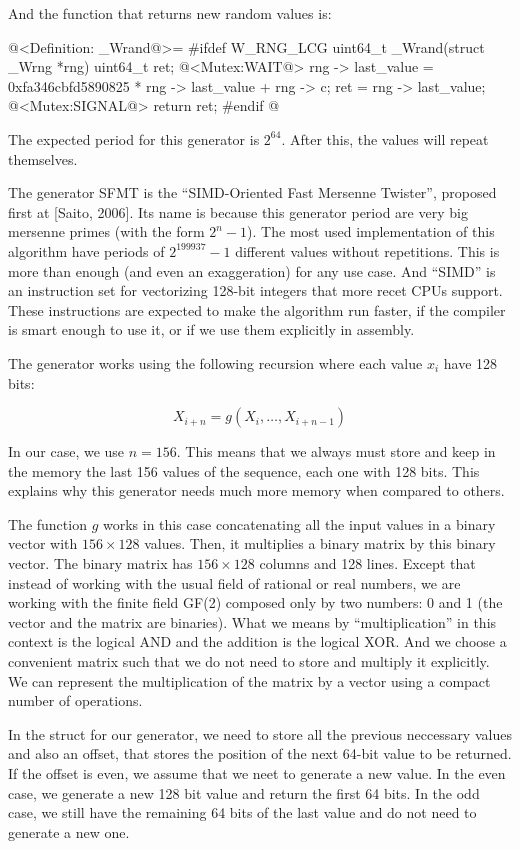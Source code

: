 And the function that returns new random values is:

\iniciocodigo
@<Definition: \_Wrand@>=
#ifdef W_RNG_LCG
uint64_t _Wrand(struct _Wrng *rng){
  uint64_t ret;
  @<Mutex:WAIT@>
  rng -> last_value = 0xfa346cbfd5890825 * rng -> last_value + rng -> c;
  ret = rng -> last_value;
  @<Mutex:SIGNAL@>
  return ret;
}
#endif
@
\fimcodigo

The expected period for this generator is $2^{64}$. After this, the
values will repeat themselves.


The generator SFMT is the ``SIMD-Oriented Fast Mersenne Twister'',
proposed first at [Saito, 2006]. Its name is because this generator
period are very big mersenne primes (with the form $2^n-1$). The most
used implementation of this algorithm have periods of $2^{199937}-1$
different values without repetitions. This is more than enough (and
even an exaggeration) for any use case. And ``SIMD'' is an instruction
set for vectorizing 128-bit integers that more recet CPUs
support. These instructions are expected to make the algorithm run
faster, if the compiler is smart enough to use it, or if we use them
explicitly in assembly.

The generator works using the following recursion where each value
$x_i$ have 128 bits:

$$
X_{i+n}=g(X_i, \ldots, X_{i+n-1})
$$

In our case, we use $n=156$. This means that we always must store and
keep in the memory the last 156 values of the sequence, each one with
128 bits. This explains why this generator needs much more memory when
compared to others.

The function $g$ works in this case concatenating all the input values
in a binary vector with $156 \times 128$ values. Then, it multiplies a
binary matrix by this binary vector. The binary matrix has $156 \times
128$ columns and 128 lines. Except that instead of working with the
usual field of rational or real numbers, we are working with the
finite field GF(2) composed only by two numbers: 0 and 1 (the vector
and the matrix are binaries). What we means by ``multiplication'' in
this context is the logical AND and the addition is the logical
XOR. And we choose a convenient matrix such that we do not need to
store and multiply it explicitly. We can represent the multiplication
of the matrix by a vector using a compact number of operations.

In the struct for our generator, we need to store all the previous
neccessary values and also an offset, that stores the position of the
next 64-bit value to be returned. If the offset is even, we assume
that we neet to generate a new value. In the even case, we generate a
new 128 bit value and return the first 64 bits. In the odd case, we
still have the remaining 64 bits of the last value and do not need to
generate a new one.

